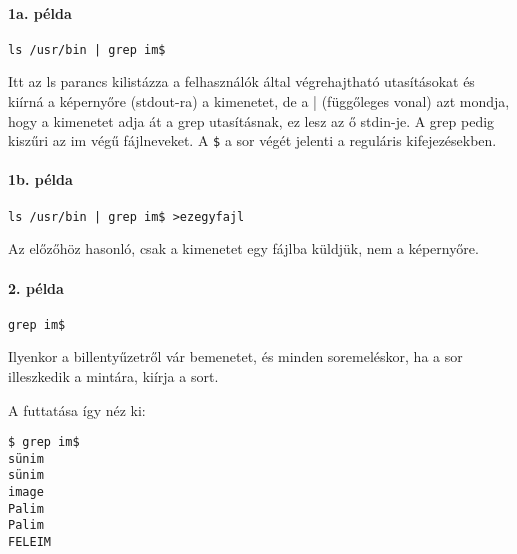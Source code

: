 \documentclass[a4paper]{article}
\begin{document}
\paragraph{1a. példa}

\verb+ls /usr/bin | grep im$+

Itt az ls parancs kilistázza a felhasználók által végrehajtható
utasításokat és kiírná a képernyőre (stdout-ra) a kimenetet, de a |
(függőleges vonal) azt mondja, hogy a kimenetet adja át a grep
utasításnak, ez lesz az ő stdin-je. A grep pedig kiszűri az im végű
fájlneveket. A \verb+$+ a sor végét jelenti a reguláris kifejezésekben.



\paragraph{1b. példa}

\verb+ls /usr/bin | grep im$ >ezegyfajl+

Az előzőhöz hasonló, csak a kimenetet egy fájlba küldjük, nem a
képernyőre.

\paragraph{2. példa}

\verb+grep im$+

Ilyenkor a billentyűzetről vár bemenetet, és minden soremeléskor, ha a
sor illeszkedik a mintára, kiírja a sort.


A futtatása így néz ki:
\begin{verbatim}
$ grep im$
sünim
sünim
image
Palim
Palim
FELEIM
\end{verbatim}
\end{document}
